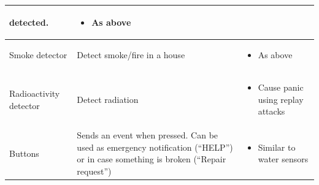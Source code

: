 {\begin{longtable}[c]{|l|l|l|}
\begin{minipage}[t]{0.30\columnwidth}
{detected.}
\strut\end{minipage} &
\begin{minipage}[t]{0.40\columnwidth}\raggedright\strut
\begin{itemize}
\tightlist
\item
  {As above}
\end{itemize}
\strut\end{minipage}\tabularnewline
\hline
\begin{minipage}[t]{0.20\columnwidth}\raggedright\strut
{Smoke detector}
\strut\end{minipage} &
\begin{minipage}[t]{0.30\columnwidth}\raggedright\strut
{Detect smoke/fire in a house}
\strut\end{minipage} &
\begin{minipage}[t]{0.40\columnwidth}\raggedright\strut
\begin{itemize}
\tightlist
\item
  {As above}
\end{itemize}
\strut\end{minipage}\tabularnewline
\hline
\begin{minipage}[t]{0.20\columnwidth}\raggedright\strut
{Radioactivity detector}
\strut\end{minipage} &
\begin{minipage}[t]{0.30\columnwidth}\raggedright\strut
{Detect radiation}
\strut\end{minipage} &
\begin{minipage}[t]{0.40\columnwidth}\raggedright\strut
\begin{itemize}
\tightlist
\item
  {Cause panic using replay attacks}
\end{itemize}
\strut\end{minipage}\tabularnewline
\hline
\begin{minipage}[t]{0.20\columnwidth}\raggedright\strut
{Buttons}
\strut\end{minipage} &
\begin{minipage}[t]{0.30\columnwidth}\raggedright\strut
{Sends an event when pressed. Can be used as emergency notification
(``HELP'') or in case something is broken (``Repair request'')}
\strut\end{minipage} &
\begin{minipage}[t]{0.40\columnwidth}\raggedright\strut
\begin{itemize}
\tightlist
\item
  {Similar to water sensors}

\end{itemize}
\end{minipage}
\end{longtable}}
